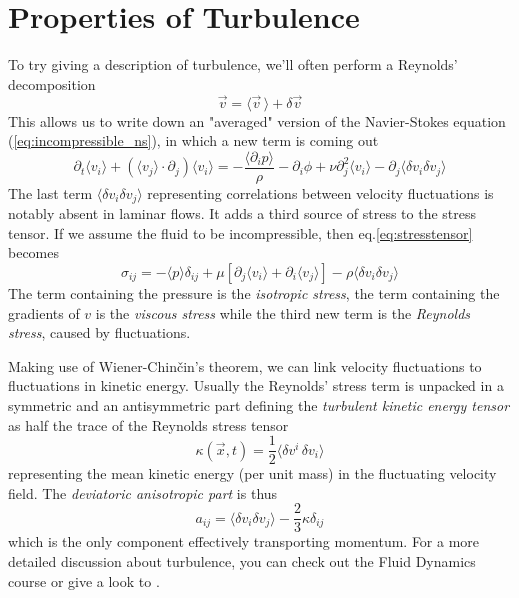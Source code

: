 \section{Properties of Turbulence}
To try giving a description of turbulence, we'll often perform a Reynolds' decomposition
\begin{equation*}
    \vec{v} = \langle\vec{v}\,\rangle +\delta\vec{v}
\end{equation*}
This allows us to write down an "averaged" version of the Navier-Stokes equation (\ref{eq:incompressible_ns}), in which a new term is coming out 
\begin{equation*}
    \partial_{t}\langle v_{i}\rangle+(\langle v_{j}\rangle\cdot\partial_{j})\langle v_{i}\rangle = -\frac{\langle \partial_{i}p\rangle}{\rho}-\partial_{i}\phi+\nu\partial^{2}_{j}\langle v_{i} \rangle-\partial_{j}\langle\delta v_{i}\delta v_{j} \rangle
\end{equation*}
The last term $\langle\delta v_{i}\delta v_{j} \rangle$ representing correlations between velocity fluctuations is notably absent in laminar flows. It adds a third source of stress to the stress tensor. If we assume the fluid to be incompressible, then eq.\ref{eq:stresstensor} becomes
\begin{equation*}
    \sigma_{ij} = -\langle p \rangle\delta_{ij}+\mu\left[\partial_{j}\langle v_{i}\rangle +\partial_{i}\langle v_{j}\rangle \right]-\rho\langle\delta v_{i}\delta v_{j}\rangle
\end{equation*}
The term containing the pressure is the \emph{isotropic stress}, the term containing the gradients of $v$ is the \emph{viscous stress} while the third new term is the \emph{Reynolds stress}, caused by fluctuations.
\par Making use of Wiener-Chinčin's theorem, we can link velocity fluctuations to fluctuations in kinetic energy. Usually the Reynolds' stress term is unpacked in a symmetric and an antisymmetric part defining the \emph{turbulent kinetic energy tensor} as half the trace of the Reynolds stress tensor
\begin{equation*}
    \kappa(\vec{x},t) = \frac{1}{2}\langle \delta v^{i}\,\delta v_{i} \rangle
\end{equation*}
representing the mean kinetic energy (per unit mass) in the fluctuating velocity field. The \emph{deviatoric anisotropic part} is thus
\begin{equation*}
    a_{ij} = \langle\delta v_{i}\delta v_{j}\rangle-\frac{2}{3}\kappa\delta_{ij}
\end{equation*}
which is the only component effectively transporting momentum. For a more detailed discussion about turbulence, you can check out the Fluid Dynamics course or give a look to \cite{Pope_2000}.
